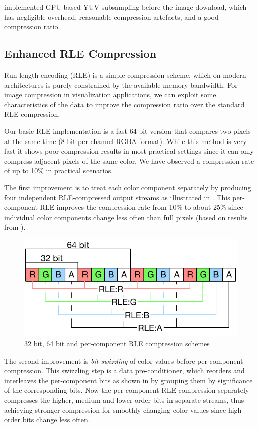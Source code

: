 \cite{MEP:10} implemented GPU-based YUV subsampling before the image download,
which has negligible overhead, reasonable compression artefacts, and a good
compression ratio.

\subsection{Enhanced RLE Compression}

Run-length encoding (RLE) is a simple compression scheme, which on modern
architectures is purely constrained by the available memory bandwidth. For image
compression in visualization applications, we can exploit some characteristics
of the data to improve the compression ratio over the standard RLE compression.

Our basic RLE implementation is a fast 64-bit version that compares two pixels
at the same time (8 bit per channel RGBA format). While this method is very
fast it shows poor compression results in most practical settings since it can
only compress adjacent pixels of the same color. We have observed a compression
rate of up to 10\% in practical scenarios.

The first improvement is to treat each color component separately by producing
four independent RLE-compressed output streams as illustrated in .
This per-component RLE improves the compression rate from 10\% to about 25\%
since individual color components change less often than full pixels (based on
results from \cite{MEP:10}).

\begin{figure}
  \includegraphics[width=.618\textwidth]{images/RLE}
  \caption{32 bit, 64 bit and per-component RLE compression schemes}
  \label{fRLE}
\end{figure}

The second improvement is {\em bit-swizzling} of color values before
per-component compression. This swizzling step is a data pre-conditioner, which
reorders and interleaves the per-component bits as shown in  by
grouping them by significance of the corresponding bits. Now the per-component
RLE compression separately compresses the higher, medium and lower order bits
in separate streams, thus achieving stronger compression for smoothly changing
color values since high-order bits change less often.

